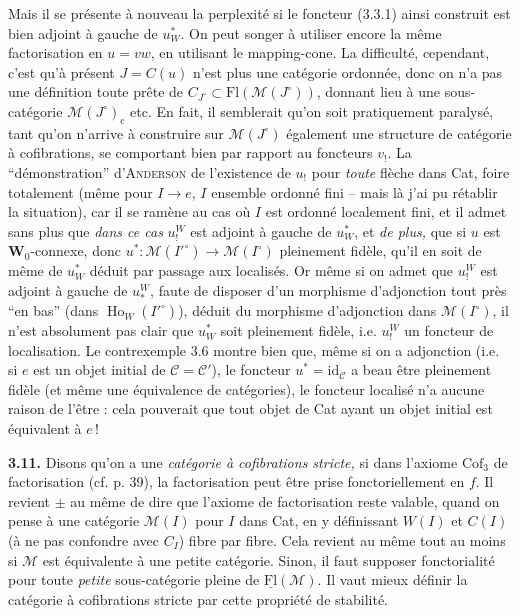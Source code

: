 \documentclass[11pt]{article}
\newcommand{\printedpage}[1]{\marginpar{\footnotesize p.~#1}}
\newcommand{\msp}[1]{\marginpar{\footnotesize [#1]}}
\newcommand{\Fl}{\mathrm{Fl}}
\newcommand{\M}{\mathcal{M}}
\newcommand{\Ho}{\operatorname{Ho}}
\newcommand{\id}{\mathrm{id}}
\begin{document}
\msp{page 67}
Mais il se présente à nouveau la perplexité si le foncteur (3.3.1) ainsi construit est bien adjoint à gauche de $u_W^*$. On peut songer à utiliser encore la même factorisation en $u = vw$, en
\printedpage{33}
utilisant le mapping-cone. La difficulté, cependant, c'est qu'à présent $J = C(u)$ n'est plus une catégorie ordonnée, donc on n'a pas une définition toute prête de $C_{J^\circ}\subset\Fl(\M(J^\circ))$, donnant lieu à une sous-catégorie $\M(J^\circ)_{\mathrm{c}}$ etc. En fait, il semblerait qu'on soit pratiquement paralysé, tant qu'on n'arrive à construire sur $\M(J^\circ)$ également une structure de catégorie à cofibrations, se comportant bien par rapport au foncteurs $v_!$. La %
“démonstration” d'\textsc{Anderson} de l'existence de $u_!$ pour \textit{toute} flèche dans Cat, foire totalement (même pour $I\longrightarrow e$, $I$ ensemble ordonné fini – mais là j'ai pu rétablir la situation), car il se ramène au cas où $I$ est ordonné localement fini, et il
\msp{page 68}
admet sans plus que \textit{dans ce cas} $u_!^W$ est adjoint à gauche de $u_W^*$, et \textit{de plus,} que si $u$ est $\mathbf{W}_0$-connexe, donc $u^* : \M(I'^\circ)\longrightarrow\M(I^\circ)$ pleinement fidèle, qu'il en soit de même de $u_W^*$ déduit par passage aux localisés. Or même si on admet que $u_!^W$ est adjoint à gauche de
$u_*^W$, faute de disposer d'un morphisme d'adjonction tout près “en bas” (dans $\Ho_W(I'^\circ)$), %
déduit du morphisme d'adjonction dans $\M(I^\circ)$, il n'est absolument pas clair que $u_W^*$ soit pleinement fidèle, i.e. $u_!^W$ un foncteur de localisation. Le contrexemple 3.6 montre bien que, même si on a adjonction (i.e. si $e$ est un objet initial de $\mathcal{C} = \mathcal{C}'$), le foncteur $u^* = \id_{\mathcal{C}}$ a beau être pleinement fidèle (et même une équivalence de catégories), le foncteur localisé n'a aucune raison de l'être : cela pouverait que tout objet de Cat ayant un objet initial %
est équivalent à $e$\,!

\msp{page 69}
\textbf{3.11.} Disons qu'on a une \textit{catégorie à cofibrations stricte,} si dans l'axiome $\mathrm{Cof}_3$ de factorisation (cf. p. 39), la factorisation peut être prise fonctoriellement en $f$. Il revient $\pm$ au même de dire que l'axiome de factorisation reste valable, quand on pense à une catégorie $\M(I)$ pour $I$ dans Cat, en y définissant $W(I)$ et $C(I)$ (à ne pas confondre avec $C_I$) fibre par fibre. Cela revient au même tout au moins si $\M$ est équivalente à une petite catégorie. Sinon, il faut supposer fonctorialité pour toute \textit{petite} sous-catégorie pleine de $\underline{\mathrm{Fl}}(\M)$. Il vaut mieux définir la catégorie à cofibrations stricte par cette propriété de stabilité.
\end{document}
